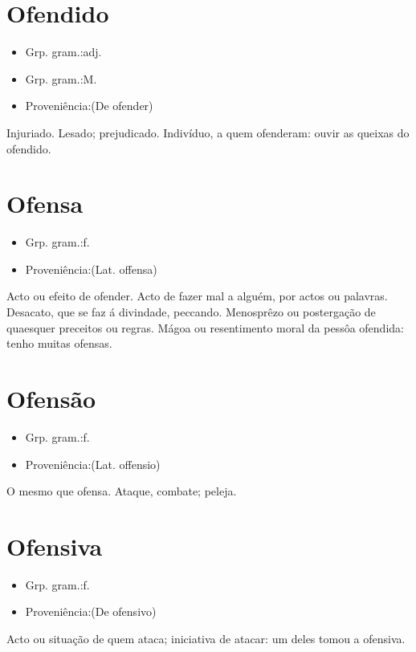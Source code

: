 \section{Ofendido}
\begin{itemize}
\item {Grp. gram.:adj.}
\end{itemize}
\begin{itemize}
\item {Grp. gram.:M.}
\end{itemize}
\begin{itemize}
\item {Proveniência:(De \textunderscore ofender\textunderscore )}
\end{itemize}
Injuriado.
Lesado; prejudicado.
Indivíduo, a quem ofenderam: \textunderscore ouvir as queixas do ofendido\textunderscore .
\section{Ofensa}
\begin{itemize}
\item {Grp. gram.:f.}
\end{itemize}
\begin{itemize}
\item {Proveniência:(Lat. \textunderscore offensa\textunderscore )}
\end{itemize}
Acto ou efeito de ofender.
Acto de fazer mal a alguém, por actos ou palavras.
Desacato, que se faz á divindade, peccando.
Menosprêzo ou postergação de quaesquer preceitos ou regras.
Mágoa ou resentimento moral da pessôa ofendida: \textunderscore tenho muitas ofensas\textunderscore .
\section{Ofensão}
\begin{itemize}
\item {Grp. gram.:f.}
\end{itemize}
\begin{itemize}
\item {Proveniência:(Lat. \textunderscore offensio\textunderscore )}
\end{itemize}
O mesmo que \textunderscore ofensa\textunderscore .
Ataque, combate; peleja.
\section{Ofensiva}
\begin{itemize}
\item {Grp. gram.:f.}
\end{itemize}
\begin{itemize}
\item {Proveniência:(De \textunderscore ofensivo\textunderscore )}
\end{itemize}
Acto ou situação de quem ataca; iniciativa de atacar: \textunderscore um deles tomou a ofensiva\textunderscore .
